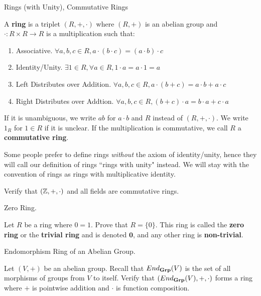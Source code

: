\documentclass[../book.tex]{subfiles}
\begin{document}
\begin{dfn} Rings (with Unity), Commutative Rings
    
    A \textbf{ring} is a triplet $(R,+,\cdot)$ where
    $(R,+)$ is an abelian group and 
    $\cdot : R \times R \to R$ is a multiplication such that:
    \begin{enumerate}
        \item Associative. 
        $\forall a, b, c \in R, a \cdot (b \cdot c) = (a \cdot b) \cdot c$
        \item Identity/Unity. 
        $\exists 1 \in R, \forall a \in R, 1 \cdot a = a \cdot 1 = a$
        \item Left Distributes over Addition. 
        $\forall a, b, c \in R, a\cdot(b + c) = a\cdot b + a\cdot c$
        \item Right Distributes over Addtion.
        $\forall a, b, c \in R, (b + c)\cdot a = b\cdot a + c\cdot a$
    \end{enumerate}
    If it is unambiguous, we write $ab$ for $a\cdot b$ and
    $R$ instead of $(R,+,\cdot)$. 
    We write $1_R$ for $1 \in R$ if it is unclear. 
    If the multiplication is commutative, we call $R$ a \textbf{commutative ring}.
    
    Some people prefer to define rings \emph{without} the axiom of identity/unity,
    hence they will call our definition of rings ``rings with unity" instead. 
    We will stay with the convention of rings as rings with multiplicative identity.
    
\end{dfn}

\begin{ex}
    Verify that $(\mathbb{Z},+,\cdot)$ and all fields are commutative rings. 
\end{ex}

\begin{ex} Zero Ring.
    
    Let $R$ be a ring where $0 = 1$. Prove that $R = \{0\}$.
    This ring is called the \textbf{zero ring} 
    or the \textbf{trivial ring} and is denoted $\textbf{0}$, 
    and any other ring is \textbf{non-trivial}.
\end{ex}

\begin{ex} Endomorphism Ring of an Abelian Group. 

    Let $(V,+)$ be an abelian group. 
    Recall that $End_{\mathbf{Grp}}(V)$ is 
    the set of all morphisms of groups from $V$ to itself.
    Verify that $(End_{\mathbf{Grp}}(V),+,\cdot)$ forms a ring where
    $+$ is pointwise addition and $\cdot$ is function composition. 
    
\end{ex}
\end{document}
